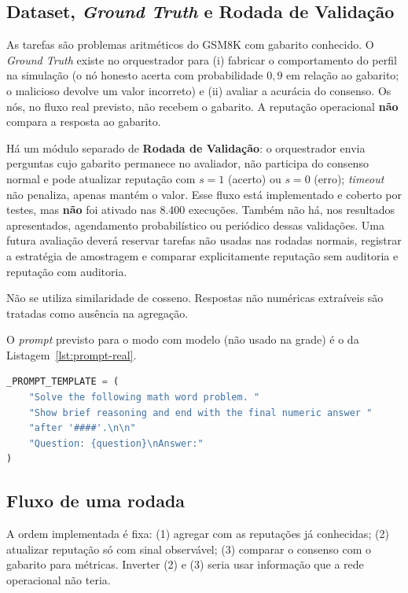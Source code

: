 \documentclass[12pt]{article}
\begin{document}
\subsection{Dataset, \textit{Ground Truth} e Rodada de Validação}

As tarefas são problemas aritméticos do GSM8K com gabarito conhecido. O \textit{Ground Truth} existe no orquestrador para (i) fabricar o comportamento do perfil na simulação (o nó honesto acerta com probabilidade $0{,}9$ em relação ao gabarito; o malicioso devolve um valor incorreto) e (ii) avaliar a acurácia do consenso. Os nós, no fluxo real previsto, não recebem o gabarito. A reputação operacional \textbf{não} compara a resposta ao gabarito.

Há um módulo separado de \textbf{Rodada de Validação}: o orquestrador envia perguntas cujo gabarito permanece no avaliador, não participa do consenso normal e pode atualizar reputação com $s=1$ (acerto) ou $s=0$ (erro); \textit{timeout} não penaliza, apenas mantém o valor. Esse fluxo está implementado e coberto por testes, mas \textbf{não} foi ativado nas 8.400 execuções. Também não há, nos resultados apresentados, agendamento probabilístico ou periódico dessas validações. Uma futura avaliação deverá reservar tarefas não usadas nas rodadas normais, registrar a estratégia de amostragem e comparar explicitamente reputação sem auditoria e reputação com auditoria.

Não se utiliza similaridade de cosseno. Respostas não numéricas extraíveis são tratadas como ausência na agregação.

O \textit{prompt} previsto para o modo com modelo (não usado na grade) é o da Listagem~\ref{lst:prompt-real}.

\begin{lstlisting}[language=Python,caption={\textit{Prompt} de inferência previsto para o modo com modelo (\texttt{sistema/node/inference.py}).},label={lst:prompt-real}]
_PROMPT_TEMPLATE = (
    "Solve the following math word problem. "
    "Show brief reasoning and end with the final numeric answer "
    "after '####'.\n\n"
    "Question: {question}\nAnswer:"
)
\end{lstlisting}

\subsection{Fluxo de uma rodada}

A ordem implementada é fixa: (1) agregar com as reputações já conhecidas; (2) atualizar reputação só com sinal observável; (3) comparar o consenso com o gabarito para métricas. Inverter (2) e (3) seria usar informação que a rede operacional não teria.
\end{document}

